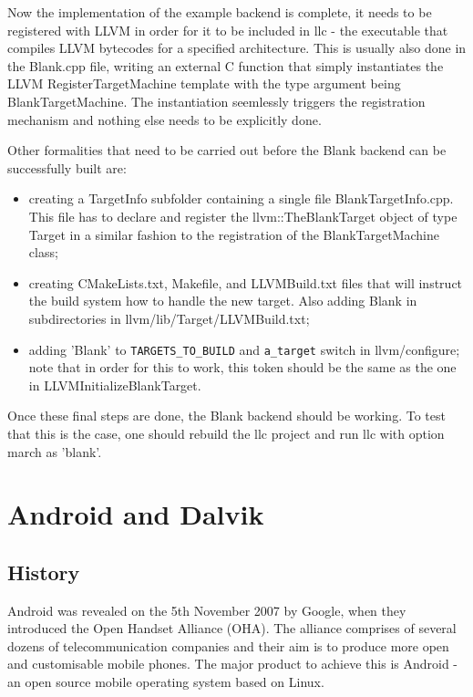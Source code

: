 \documentclass[parskip]{cs4rep}
\begin{document}
Now the implementation of the example backend is complete, it needs to be registered with LLVM in order for it to be included in llc - the executable that compiles LLVM bytecodes for a specified architecture. This is usually also done in the Blank.cpp file, writing an external C function that simply instantiates the LLVM RegisterTargetMachine template with the type argument being BlankTargetMachine. The instantiation seemlessly triggers the registration mechanism and nothing else needs to be explicitly done.

Other formalities that need to be carried out before the Blank backend can be successfully built are:
\begin{itemize}
\item
creating a TargetInfo subfolder containing a single file BlankTargetInfo.cpp. This file has to declare and register the llvm::TheBlankTarget object of type Target in a similar fashion to the registration of the BlankTargetMachine class;
\item
creating CMakeLists.txt, Makefile, and LLVMBuild.txt files that will instruct the build system how to handle the new target. Also adding Blank in subdirectories in llvm/lib/Target/LLVMBuild.txt;
\item
adding 'Blank' to \verb|TARGETS_TO_BUILD| and \verb|a_target| switch in llvm/configure; note that in order for this to work, this token should be the same as the one in LLVMInitializeBlankTarget.
\end{itemize}

Once these final steps are done, the Blank backend should be working. To test that this is the case, one should rebuild the llc project and run llc with option march as 'blank'.

\section{Android and Dalvik}

\subsection{History}

Android was revealed on the 5th November 2007 by Google, when they introduced the Open Handset Alliance (OHA)\cite{DeLacey2007}. The alliance comprises of several dozens of telecommunication companies and their aim is to produce more open and customisable mobile phones. The major product to achieve this is Android - an open source mobile operating system based on Linux.
\end{document}
